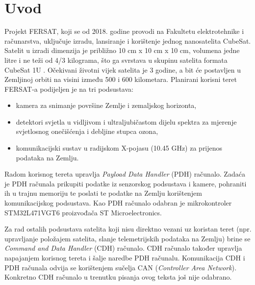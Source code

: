 \chapter{Uvod}
Projekt FERSAT, koji se od 2018. godine provodi na Fakultetu elektrotehnike i računarstva, uključuje izradu, lansiranje i korištenje jednog nanosatelita CubeSat. Satelit u izradi dimenzija je približno 10 cm x 10 cm x 10 cm, volumena jedne litre i ne teži od 4/3 kilograma, što ga svrstava u skupinu satelita formata CubeSat 1U \cite{fersat_stranica_projekta}. Očekivani životni vijek satelita je 3 godine, a bit će postavljen u Zemljinoj orbiti na visini između 500 i 600 kilometara. Planirani korisni teret  FERSAT-a podijeljen je na tri podsustava:

    \begin{itemize}
        \item kamera za snimanje površine Zemlje i zemaljskog horizonta,
        \item detektori svjetla u vidljivom i ultraljubičastom dijelu spektra za mjerenje svjetlosnog onečišćenja i debljine stupca ozona,
        \item komunikacijski sustav u radijskom X-pojasu (10.45 GHz) za prijenos podataka na Zemlju.
    \end{itemize}

    Radom korisnog tereta upravlja \textit{Payload Data Handler} (PDH) računalo. Zadaća je PDH računala prikupiti podatke iz senzorskog podsustava i kamere, pohraniti ih u trajnu memoriju  te poslati te podatke na Zemlju korištenjem komunikacijskog podsustava. Kao PDH računalo odabran je mikrokontroler STM32L471VGT6 proizvođača ST Microelectronics.

    Za rad ostalih podsustava satelita koji nisu direktno vezani uz koristan teret (npr. upravljanje položajem satelita, slanje telemetrijskih podataka na Zemlju) brine se \textit{Command and Data Handler} (CDH) računalo. CDH računalo također upravlja napajanjem korisnog tereta i šalje naredbe PDH računalu. Komunikacija CDH i PDH računala odvija se korištenjem sučelja CAN (\textit{Controller Area Network}). Konkretno CDH računalo u trenutku pisanja ovog teksta još nije odabrano.